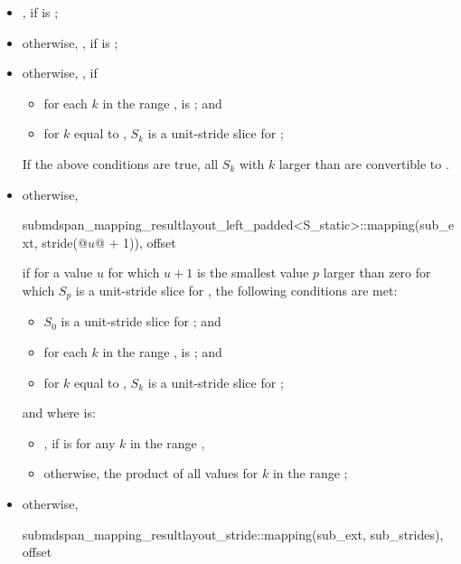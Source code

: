 \begin{itemdescr}
\pnum
\returns
\begin{itemize}
\item
{},
if  is ;
\item
otherwise,
,
if  is ;
\item
otherwise,
,
if
  \begin{itemize}
  \item
  for each $k$ in the range ,
   is ; and
  \item
  for $k$ equal to ,
  $S_k$ is a unit-stride slice for ;
  \end{itemize}
\begin{note}
If the above conditions are true,
all $S_k$ with $k$ larger than 
are convertible to .
\end{note}
\item
otherwise,
\begin{codeblock}
submdspan_mapping_result{layout_left_padded<S_static>::mapping(sub_ext, stride(@$u$@ + 1)),
                         offset}
\end{codeblock}
if for a value $u$ for which $u+1$ is
the smallest value $p$ larger than zero
for which $S_p$ is a unit-stride slice for ,
the following conditions are met:
\begin{itemize}
\item
$S_0$ is a unit-stride slice for ; and
\item
for each $k$ in the range ,
 is ; and
\item
for $k$ equal to ,
$S_k$ is a unit-stride slice for ;
\end{itemize}
and where  is:
\begin{itemize}
\item
{},
if  is 
for any $k$ in the range ,
\item
otherwise, the product of all values
 for $k$ in the range ;
\end{itemize}
\item
otherwise,
\begin{codeblock}
submdspan_mapping_result{layout_stride::mapping(sub_ext, sub_strides), offset}
\end{codeblock}
\end{itemize}
\end{itemdescr}

